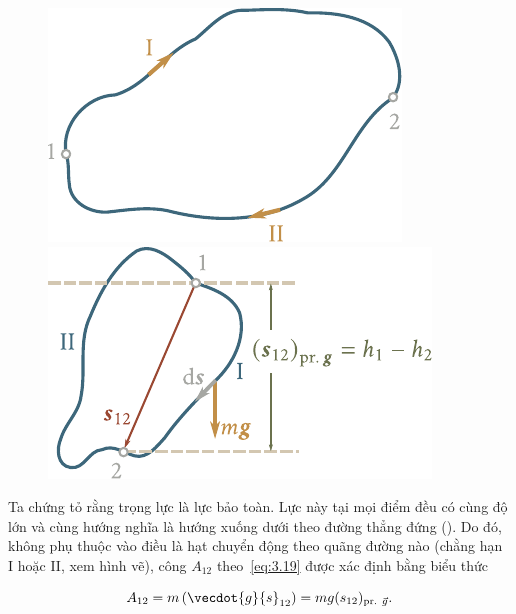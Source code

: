 \begin{figure}[!htb]
	\begin{minipage}[t]{0.5\linewidth}
		\begin{center}
			\includegraphics[scale=0.92]{figures/ch_03/fig_3_5.pdf}
			\caption[]{}
			\label{fig:3_5}
		\end{center}
	\end{minipage}
	\hspace{-0.05cm}
	\begin{minipage}[t]{0.5\linewidth}
		\begin{center}
			\includegraphics[scale=0.9]{figures/ch_03/fig_3_6.pdf}
			\caption[]{}
			\label{fig:3_6}
		\end{center}
	\end{minipage}
\end{figure}

Ta chứng tỏ rằng trọng lực là lực bảo toàn. Lực này tại mọi điểm đều có cùng độ lớn và cùng hướng nghĩa là hướng xuống dưới theo đường thẳng đứng (). Do đó, không phụ thuộc vào điều là hạt chuyển động theo quãng đường nào (chằng hạn I hoặc II, xem hình vẽ), công $A_{12}$ theo~\eqref{eq:3.19} được xác định bằng biểu thức 

\begin{equation*}
A_{12} = m\,(\vecdot{g}{s}_{12}) = mg(s_{12})_{\text{pr. }\vec{g}}.
\end{equation*}

